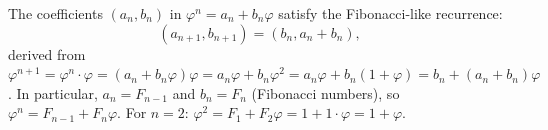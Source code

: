 \begin{center}
\end{center}

The coefficients $(a_{n}, b_{n})$ in $\varphi^{n} = a_{n}+b_{n}\varphi$
satisfy the Fibonacci-like recurrence:
\[
  (a_{n+1}, b_{n+1}) = (b_{n}, a_{n}+b_{n}),
\]
derived from $\varphi^{n+1} = \varphi^{n} \cdot \varphi = (a_{n}+b_{n}\varphi)\varphi
= a_{n}\varphi + b_{n}\varphi^{2} = a_{n}\varphi + b_{n}(1+\varphi)
= b_{n} + (a_{n}+b_{n})\varphi$.
In particular, $a_{n} = F_{n-1}$ and $b_{n} = F_{n}$
(Fibonacci numbers), so $\varphi^{n} = F_{n-1}+F_{n}\varphi$.
For $n=2$: $\varphi^{2} = F_{1}+F_{2}\varphi = 1+1\cdot\varphi = 1+\varphi$.
\checkmark

